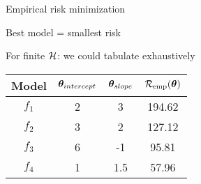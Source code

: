 \documentclass[11pt,compress,t,notes=noshow, xcolor=table]{beamer}
\begin{document}
\begin{vbframe}{Empirical risk minimization}
  
  \begin{itemizeM}
    \item Best model = smallest risk
    \item For finite $\mathcal{H}$: we could tabulate exhaustively
  \end{itemizeM}
  
  \vfill
  
  \begin{center}
    \begin{tabular}{ c | c | c || c }
      Model & \(\displaystyle \bm{\theta}_{intercept} \) & \(\displaystyle \bm{\theta}_{slope} \) & \(\displaystyle \mathcal{R}_{\text{emp}}(\bm{\theta}) \) \\ 
      \hline
\(\displaystyle f_1 \)   & 2 & 3 & 194.62 \\
\(\displaystyle f_2 \)   & 3 & 2 & 127.12 \\  
\(\displaystyle f_3 \)   & 6 & -1 & 95.81 \\
      \rowcolor{lightgray}
\(\displaystyle f_4 \)   & 1 & 1.5 & 57.96 \\  
    \end{tabular}
  \end{center}
  
\end{vbframe}
\end{document}

